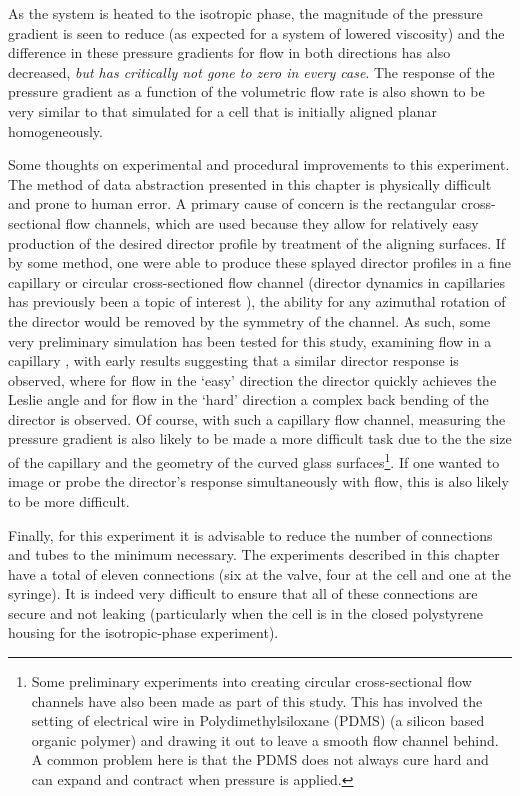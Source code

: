 As the system is heated to the isotropic phase, the magnitude of the pressure gradient is seen to reduce (as expected for a system of lowered viscosity) and the difference in these pressure gradients for flow in both directions has also decreased, \textit{but has critically not gone to zero in every case}. The response of the pressure gradient as a function of the volumetric flow rate is also shown to be very similar to that simulated for a cell that is initially aligned planar homogeneously.

Some thoughts on experimental and procedural improvements to this experiment. The method of data abstraction presented in this chapter is physically difficult and prone to human error. A primary cause of concern is the rectangular cross-sectional flow channels, which are used because they allow for relatively easy production of the desired director profile by treatment of the aligning surfaces. If by some method, one were able to produce these splayed director profiles in a fine capillary or circular cross-sectioned flow channel (director dynamics in capillaries has previously been a topic of interest \cite{Cladis1972,Palffy-muhoray1993,Ziherl1996}), the ability for any azimuthal rotation of the director would be removed by the symmetry of the channel. As such, some very preliminary simulation has been tested for this study, examining flow in a capillary \cite{Athertona}, with early results suggesting that a similar director response is observed, where for flow in the `easy' direction the director quickly achieves the Leslie angle and for flow in the `hard' direction a complex back bending of the director is observed. Of course, with such a capillary flow channel, measuring the pressure gradient is also likely to be made a more difficult task due to the the size of the capillary and the geometry of the curved glass surfaces\footnote{Some preliminary experiments into creating circular cross-sectional flow channels have also been made as part of this study. This has involved the setting of electrical wire in Polydimethylsiloxane (PDMS) (a silicon based organic polymer) and drawing it out to leave a smooth flow channel behind. A common problem here is that the PDMS does not always cure hard and can expand and contract when pressure is applied.}. If one wanted to image or probe the director's response simultaneously with flow, this is also likely to be more difficult.

Finally, for this experiment it is advisable to reduce the number of connections and tubes to the minimum necessary. The experiments described in this chapter have a total of eleven connections (six at the valve, four at the cell and one at the syringe). It is indeed very difficult to ensure that all of these connections are secure and not leaking (particularly when the cell is in the closed polystyrene housing for the isotropic-phase experiment).
